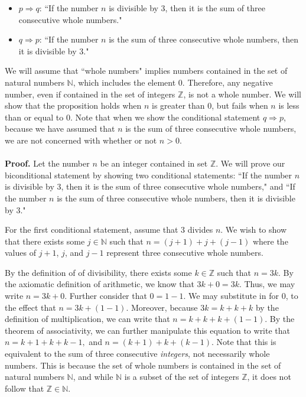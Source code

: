 \documentclass[12pt]{exam}
\begin{document}
\begin{questions}
\begin{itemize}
 \item $p \Rightarrow q$: ``If the number $n$ is divisible by 3, then it is the sum of three consecutive whole numbers."
 \item $q \Rightarrow p$: ``If the number $n$ is the sum of three consecutive whole numbers, then it is divisible by 3."
 \end{itemize}
 We will assume that ``whole numbers" implies numbers contained in the set of natural numbers $\mathbb N$, which includes the element 0. Therefore, any negative number, even if contained in the set of integers $\mathbb Z$, is not a whole number. We will show that the proposition holds when $n$ is greater than $0$, but fails when $n$ is less than or equal to $0$. Note that when we show the conditional statement $q \Rightarrow p$, because we have assumed that $n$ is the sum of three consecutive whole numbers, we are not concerned with whether or not $n>0$.
\\
\\\textbf{Proof.} Let the number $n$ be an integer contained in set $\mathbb Z$. We will prove our biconditional statement by showing two conditional statements: ``If the number $n$ is divisible by 3, then it is the sum of three consecutive whole numbers," and ``If the number $n$ is the sum of three consecutive whole numbers, then it is divisible by 3."
\par
For the first conditional statement, assume that $3$ divides $n$. We wish to show that there exists some $j \in \mathbb N$ such that $n = (j+1) + j +(j-1)$ where the values of $j+1$, $j$, and $j-1$ represent three consecutive whole numbers.
\par
By the definition of of divisibility, there exists some $k \in \mathbb{Z}$ such that $n = 3k$. By the axiomatic definition of arithmetic, we know that $3k +0 = 3k$. Thus, we may write $n = 3k +0$. Further consider that $0 = 1-1$. We may substitute in for $0$, to the effect that $n = 3k +(1-1)$. Moreover, because $3k = k+k+k$ by the definition of multiplication, we can write that $n = k+k+k +(1-1)$. By the theorem of associativity, we can further manipulate this equation to write that $n = k+1 + k +k -1,$ and $n = (k+1) + k + (k-1)$. Note that this is equivalent to the sum of three consecutive \textit{integers}, not necessarily whole numbers. This is because the set of whole numbers is contained in the set of natural numbers $\mathbb N$, and while $\mathbb N$ is a subset of the set of integers $\mathbb Z$, it does not follow that $\mathbb Z \in \mathbb N$. 

\end{questions}
\end{document}
